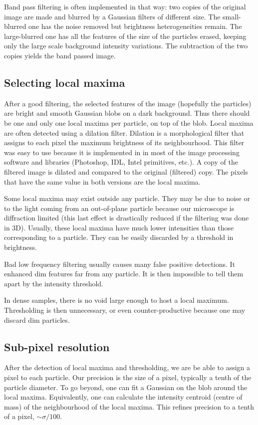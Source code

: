 Band pass filtering is often implemented in that way: two copies of the original image are made and blurred by a Gaussian filters of different size. The small-blurred one has the noise removed but brightness heterogeneities remain. The large-blurred one has all the features of the size of the particles erased, keeping only the large scale background intensity variations. The subtraction of the two copies yields the band passed image.

\subsection{Selecting local maxima}

After a good filtering, the selected features of the image (hopefully the particles) are bright and smooth Gaussian blobs on a dark background. Thus there should be one and only one local maxima per particle, on top of the blob. Local maxima are often detected using a dilation filter. Dilation is a morphological filter that assigns to each pixel the maximum brightness of its neighbourhood. This filter was easy to use because it is implemented in in most of the image processing software and libraries (Photoshop, IDL, Intel primitives, etc.). A copy of the filtered image is dilated and compared to the original (filtered) copy. The pixels that have the same value in both versions are the local maxima.

Some local maxima may exist outside any particle. They may be due to noise or to the light coming from an out-of-plane particle because our microscope is diffraction limited (this last effect is drastically reduced if the filtering was done in 3D). Usually, these local maxima have much lower intensities than those corresponding to a particle. They can be easily discarded by a threshold in brightness.

Bad low frequency filtering usually causes many false positive detections. It enhanced dim features far from any particle. It is then impossible to tell them apart by the intensity threshold.

In dense samples, there is no void large enough to host a local maximum. Thresholding is then unnecessary, or even counter-productive because one may discard dim particles.

\subsection{Sub-pixel resolution}

After the detection of local maxima and thresholding, we are be able to assign a pixel to each particle. Our precision is the size of a pixel, typically a tenth of the particle diameter. To go beyond, one can fit a Gaussian on the blob around the local maxima. Equivalently, one can calculate the intensity centroid (centre of mass) of the neighbourhood of the local maxima. This refines precision to a tenth of a pixel,  $\sim\sigma/100$.

